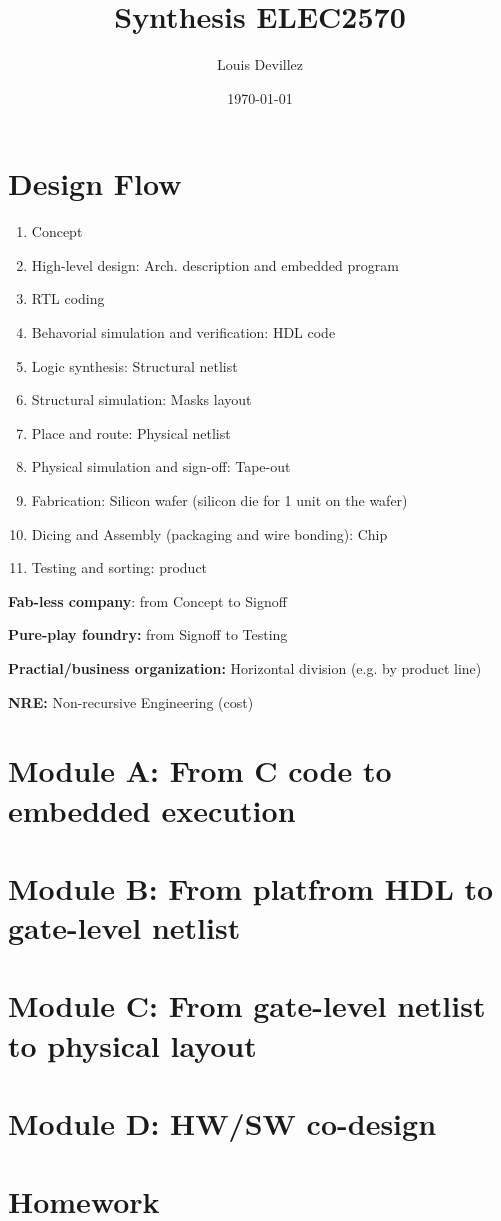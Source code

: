 


\title{Synthesis ELEC2570}
\author{Louis Devillez}
\date{\today}



\maketitle

\tableofcontents
\section{Design Flow}
\begin{enumerate}
  \item Concept
  \item High-level design: Arch. description and embedded program
  \item RTL coding
  \item Behavorial simulation and verification: HDL code
  \item Logic synthesis: Structural netlist
  \item Structural simulation: Masks layout
  \item Place and route: Physical netlist
  \item Physical simulation and sign-off: Tape-out
  \item Fabrication: Silicon wafer (silicon die for 1 unit on the wafer)
  \item Dicing and Assembly (packaging and wire bonding): Chip
  \item Testing and sorting: product
\end{enumerate}

\textbf{Fab-less company}: from Concept to Signoff

\textbf{Pure-play foundry:} from Signoff to Testing

\textbf{Practial/business organization:} Horizontal division (e.g. by product line)

\textbf{NRE:} Non-recursive Engineering (cost)
      
\section{Module A: From C code to embedded execution}

\section{Module B: From platfrom HDL to gate-level netlist}


\section{Module C: From gate-level netlist to physical layout}

\section{Module D: HW/SW co-design}


\section{Homework}




